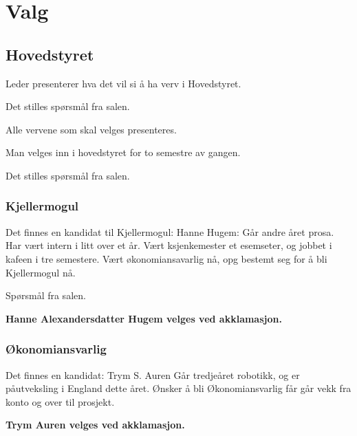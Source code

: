 \documentclass[10pt,norsk,a4paper,usenames,dvipsnames]{article}
\begin{document}
\section{Valg}
\begin{multicols}
    \subsection{Hovedstyret}

        Leder presenterer hva det vil si å ha verv i Hovedstyret.

        Det stilles spørsmål fra salen.

        Alle vervene som skal velges presenteres.

        Man velges inn i hovedstyret for to semestre av gangen.

        Det stilles spørsmål fra salen.





        \subsubsection{Kjellermogul}
        Det finnes en kandidat til Kjellermogul:
        Hanne Hugem:
        Går andre året prosa. Har vært intern i litt over et år. Vært ksjenkemester et esemseter, og jobbet i kafeen i tre semestere. Vært økonomiansavarlig nå, opg bestemt seg for å bli Kjellermogul nå.

        Spørsmål fra salen.

        \textbf{Hanne Alexandersdatter Hugem velges ved akklamasjon.}

        \subsubsection{Økonomiansvarlig}
        Det finnes en kandidat:
        Trym S. Auren
        Går tredjeåret robotikk, og er påutveksling i England dette året. Ønsker å bli Økonomiansvarlig får går vekk fra konto og over til prosjekt.

        \textbf{Trym Auren velges ved akklamasjon.}


\end{multicols}
\end{document}
